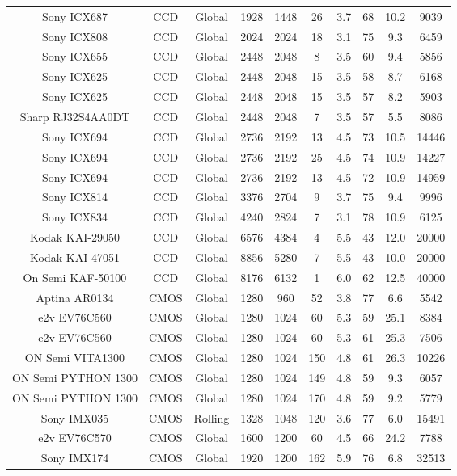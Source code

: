 \begin{table}[t]
{\begin{tabular}{cccccccccc}
Sony ICX687 & CCD & Global & 1928 & 1448 & 26 & 3.7 & 68 & 10.2 & 9039\\ 
Sony ICX808 & CCD & Global & 2024 & 2024 & 18 & 3.1 & 75 & 9.3 & 6459\\ 
Sony ICX655 & CCD & Global & 2448 & 2048 & 8 & 3.5 & 60 & 9.4 & 5856\\ 
Sony ICX625 & CCD & Global & 2448 & 2048 & 15 & 3.5 & 58 & 8.7 & 6168\\ 
Sony ICX625 & CCD & Global & 2448 & 2048 & 15 & 3.5 & 57 & 8.2 & 5903\\ 
Sharp RJ32S4AA0DT & CCD & Global & 2448 & 2048 & 7 & 3.5 & 57 & 5.5 & 8086\\ 
Sony ICX694 & CCD & Global & 2736 & 2192 & 13 & 4.5 & 73 & 10.5 & 14446\\ 
Sony ICX694 & CCD & Global & 2736 & 2192 & 25 & 4.5 & 74 & 10.9 & 14227\\ 
Sony ICX694 & CCD & Global & 2736 & 2192 & 13 & 4.5 & 72 & 10.9 & 14959\\ 
Sony ICX814 & CCD & Global & 3376 & 2704 & 9 & 3.7 & 75 & 9.4 & 9996\\ 
Sony ICX834 & CCD & Global & 4240 & 2824 & 7 & 3.1 & 78 & 10.9 & 6125\\ 
Kodak KAI-29050 & CCD & Global & 6576 & 4384 & 4 & 5.5 & 43 & 12.0 & 20000\\ 
Kodak KAI-47051 & CCD & Global & 8856 & 5280 & 7 & 5.5 & 43 & 10.0 & 20000\\ 
On Semi KAF-50100 & CCD & Global & 8176 & 6132 & 1 & 6.0 & 62 & 12.5 & 40000\\ 
Aptina AR0134 & CMOS & Global & 1280 & 960 & 52 & 3.8 & 77 & 6.6 & 5542\\ 
e2v EV76C560 & CMOS & Global & 1280 & 1024 & 60 & 5.3 & 59 & 25.1 & 8384\\ 
e2v EV76C560 & CMOS & Global & 1280 & 1024 & 60 & 5.3 & 61 & 25.3 & 7506\\ 
ON Semi VITA1300 & CMOS & Global & 1280 & 1024 & 150 & 4.8 & 61 & 26.3 & 10226\\ 
ON Semi PYTHON 1300 & CMOS & Global & 1280 & 1024 & 149 & 4.8 & 59 & 9.3 & 6057\\ 
ON Semi PYTHON 1300 & CMOS & Global & 1280 & 1024 & 170 & 4.8 & 59 & 9.2 & 5779\\ 
Sony IMX035 & CMOS & Rolling & 1328 & 1048 & 120 & 3.6 & 77 & 6.0 & 15491\\ 
e2v EV76C570 & CMOS & Global & 1600 & 1200 & 60 & 4.5 & 66 & 24.2 & 7788\\ 
Sony IMX174 & CMOS & Global & 1920 & 1200 & 162 & 5.9 & 76 & 6.8 & 32513\\ 

\end{tabular}}
\end{table}
